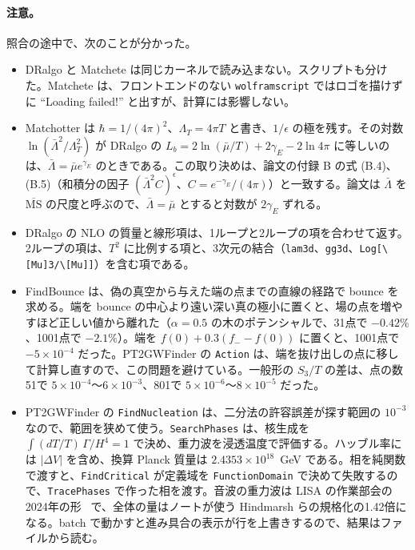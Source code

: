 \documentclass[a4paper,10pt]{ltjsarticle}
\begin{document}
\paragraph{注意。}照合の途中で、次のことが分かった。
\begin{itemize}
\item DRalgo と Matchete は同じカーネルで読み込まない。スクリプトも分けた。Matchete は、フロントエンドのない \texttt{wolframscript} ではロゴを描けずに ``Loading failed!'' と出すが、計算には影響しない。
\item Matchotter は $\hbar=1/(4\pi)^2$、$\Lambda_T=4\pi T$ と書き、$1/\epsilon$ の極を残す。その対数 $\ln(\bar\Lambda^2/\Lambda_T^2)$ が DRalgo の $L_b=2\ln(\bar\mu/T)+2\gamma_E-2\ln4\pi$ に等しいのは、$\bar\Lambda=\bar\mu e^{\gamma_E}$ のときである。この取り決めは、論文の付録 B の式 (B.4)、(B.5)（和積分の因子 $(\bar\Lambda^2C)^\epsilon$、$C=e^{-\gamma_E}/(4\pi)$）と一致する。論文は $\bar\Lambda$ を $\overline{\mathrm{MS}}$ の尺度と呼ぶので、$\bar\Lambda=\bar\mu$ とすると対数が $2\gamma_E$ ずれる。
\item DRalgo の NLO の質量と線形項は、1ループと2ループの項を合わせて返す。2ループの項は、$T^2$ に比例する項と、3次元の結合（\texttt{lam3d}、\texttt{gg3d}、\texttt{Log[\textbackslash[Mu]3/\textbackslash[Mu]]}）を含む項である。
\item FindBounce は、偽の真空から与えた端の点までの直線の経路で bounce を求める。端を bounce の中心より遠い深い真の極小に置くと、場の点を増やすほど正しい値から離れた（$\alpha=0.5$ の木のポテンシャルで、31点で $-0.42\%$、1001点で $-2.1\%$）。端を $f(0)+0.3(f_--f(0))$ に置くと、1001点で $-5\times10^{-4}$ だった。PT2GWFinder の \texttt{Action} は、端を抜け出しの点に移して計算し直すので、この問題を避けている。一般形の $S_3/T$ の差は、点の数51で $5\times10^{-4}$〜$6\times10^{-3}$、801で $5\times10^{-6}$〜$8\times10^{-5}$ だった。
\item PT2GWFinder の \texttt{FindNucleation} は、二分法の許容誤差が探す範囲の $10^{-3}$ なので、範囲を狭めて使う。\texttt{SearchPhases} は、核生成を $\int(dT/T)\,\Gamma/H^4=1$ で決め、重力波を浸透温度で評価する。ハッブル率には $|\Delta V|$ を含め、換算 Planck 質量は $2.4353\times10^{18}$~GeV である。相を純関数で渡すと、\texttt{FindCritical} が定義域を \texttt{FunctionDomain} で決めて失敗するので、\texttt{TracePhases} で作った相を渡す。音波の重力波は LISA の作業部会の2024年の形~\cite{caprini24} で、全体の量はノートが使う Hindmarsh らの規格化の1.42倍になる。batch で動かすと進み具合の表示が行を上書きするので、結果はファイルから読む。

\end{itemize}
\end{document}
